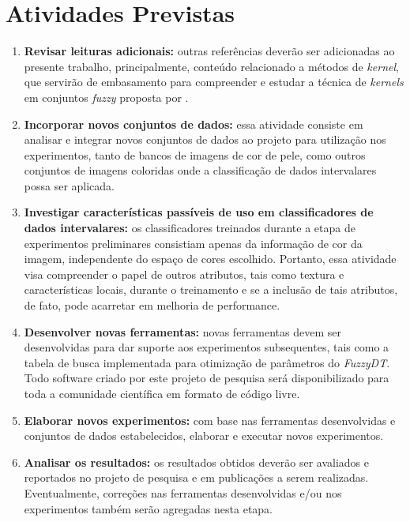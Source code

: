 \section{Atividades Previstas}
\label{sec:atividades_previstas}
\begin{enumerate}
    \item \textbf{Revisar leituras adicionais:} outras referências deverão ser adicionadas ao presente trabalho, principalmente, conteúdo relacionado a métodos de \emph{kernel}, que servirão de embasamento para compreender e estudar a técnica de \emph{kernels} em conjuntos \emph{fuzzy} proposta por \citet{guevara:14}.

    \item \textbf{Incorporar novos conjuntos de dados:} essa atividade consiste em analisar e integrar novos conjuntos de dados ao projeto para utilização nos experimentos, tanto de bancos de imagens de cor de pele, como outros conjuntos de imagens coloridas onde a classificação de dados intervalares possa ser aplicada.

    \item \textbf{Investigar características passíveis de uso em classificadores de dados intervalares:} os classificadores treinados durante a etapa de experimentos preliminares consistiam apenas da informação de cor da imagem, independente do espaço de cores escolhido. Portanto, essa atividade visa compreender o papel de outros atributos, tais como textura e características locais, durante o treinamento e se a inclusão de tais atributos, de fato, pode acarretar em melhoria de performance.

    \item \textbf{Desenvolver novas ferramentas:} novas ferramentas devem ser desenvolvidas para dar suporte aos experimentos subsequentes, tais como a tabela de busca implementada para otimização de parâmetros do \emph{FuzzyDT}. Todo software criado por este projeto de pesquisa será disponibilizado para toda a comunidade científica em formato de código livre.

    \item \textbf{Elaborar novos experimentos:} com base nas ferramentas desenvolvidas e conjuntos de dados estabelecidos, elaborar e executar novos experimentos.

    \item \textbf{Analisar os resultados:} os resultados obtidos deverão ser avaliados e reportados no projeto de pesquisa e em publicações a serem realizadas. Eventualmente, correções nas ferramentas desenvolvidas e/ou nos experimentos também serão agregadas nesta etapa.


\end{enumerate}
